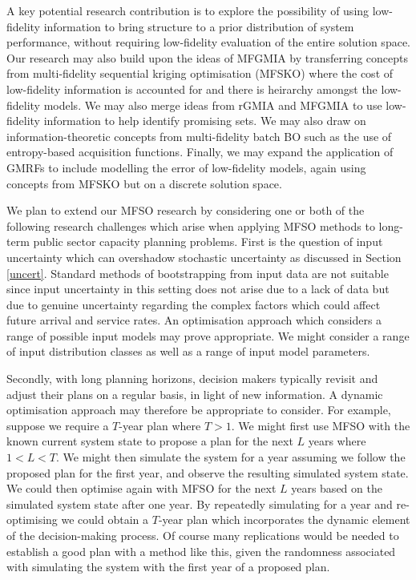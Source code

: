 \documentclass[12pt,a4paper]{article}
\begin{document}
A key potential research contribution is to explore the possibility of using low-fidelity information to bring structure to a prior distribution of system performance, without requiring low-fidelity evaluation of the entire solution space. Our research may also build upon the ideas of MFGMIA by transferring concepts from multi-fidelity sequential kriging optimisation (MFSKO) \citep{huang2006sequential} where the cost of low-fidelity information is accounted for and there is heirarchy amongst the low-fidelity models. We may also merge ideas from rGMIA and MFGMIA to use low-fidelity information to help identify promising sets. We may also draw on information-theoretic concepts from multi-fidelity batch BO such as the use of entropy-based acquisition functions. Finally, we may expand the application of GMRFs to include modelling the error of low-fidelity models, again using concepts from MFSKO but on a discrete solution space.

We plan to extend our MFSO research by considering one or both of the following research challenges which arise when applying MFSO methods to long-term public sector capacity planning problems. First is the question of input uncertainty which can overshadow stochastic uncertainty as discussed in Section \ref{uncert}. Standard methods of bootstrapping from input data are not suitable since input uncertainty in this setting does not arise due to a lack of data but due to genuine uncertainty regarding the complex factors which could affect future arrival and service rates. An optimisation approach which considers a range of possible input models may prove appropriate. We might consider a range of input distribution classes as well as a range of input model parameters.

Secondly, with long planning horizons, decision makers typically revisit and adjust their plans on a regular basis, in light of new information. A dynamic optimisation approach may therefore be appropriate to consider. For example, suppose we require a $T$-year plan where $T>1$. We might first use MFSO with the known current system state to propose a plan for the next $L$ years where $1<L<T$. We might then simulate the system for a year assuming we follow the proposed plan for the first year, and observe the resulting simulated system state. We could then optimise again with MFSO for the next $L$ years based on the simulated system state after one year. By repeatedly simulating for a year and re-optimising we could obtain a $T$-year plan which incorporates the dynamic element of the decision-making process. Of course many replications would be needed to establish a good plan with a method like this, given the randomness associated with simulating the system with the first year of a proposed plan.

\newpage



\end{document}
